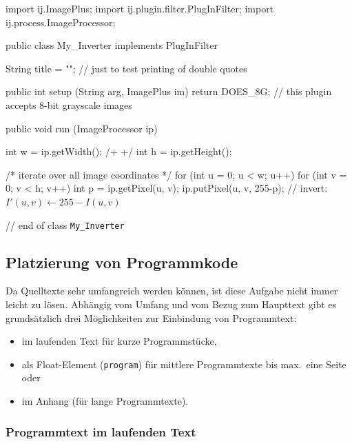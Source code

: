 \begin{program}
\caption{Beispiel für die Auflistung von Programmkode als Float-Element.}
\label{prog:CodeExample}
\begin{JavaCode}
import ij.ImagePlus;
import ij.plugin.filter.PlugInFilter;
import ij.process.ImageProcessor;

public class My_Inverter implements PlugInFilter {

  String title = ""; // just to test printing of double quotes

	public int setup (String arg, ImagePlus im) {
		return DOES_8G;	// this plugin accepts 8-bit grayscale images \label{pr:IjSamplePlugin10}
	}

	public void run (ImageProcessor ip) {
		int w = ip.getWidth();	/+ \label{ExampleCodeLabel} +/
		int h = ip.getHeight(); 
		
		/* iterate over all image coordinates */
		for (int u = 0; u < w; u++) { 
			for (int v = 0; v < h; v++) {
				int p = ip.getPixel(u, v); 
				ip.putPixel(u, v, 255-p); // invert: $I'(u,v) \leftarrow 255 - I(u,v)$\label{MathInCode}
			}
		}
	}
			
} // end of class {\tt My\_Inverter}
\end{JavaCode}
%
\end{program}


\subsection{Platzierung von Programmkode}

Da Quelltexte sehr umfangreich werden können, ist diese Aufgabe nicht
immer leicht zu lösen. Abhängig vom Umfang und vom Bezug zum Haupttext
gibt es grundsätzlich drei Möglichkeiten zur Einbindung von Programmtext:
%
\begin{itemize}
\item[a)] im laufenden Text für kurze Programmstücke,
\item[b)] als Float-Element (\texttt{program}) für mittlere Programmtexte bis max.\ eine Seite oder
\item[c)] im Anhang (für lange Programmtexte).
\end{itemize}

\subsubsection{Programmtext im laufenden Text}

